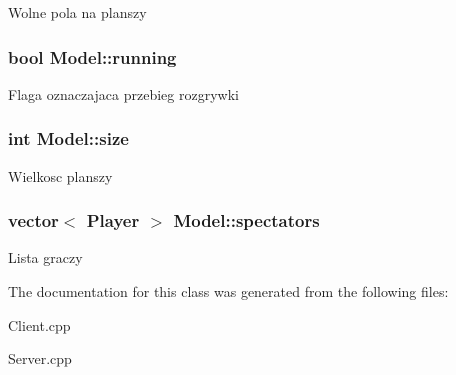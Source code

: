 Wolne pola na planszy \hypertarget{classModel_a46db7d7d8e79bf0bebd19c3e0122fba0}{
\subsubsection[{running}]{\setlength{\rightskip}{0pt plus 5cm}bool Model\-::running}}\label{classModel_a46db7d7d8e79bf0bebd19c3e0122fba0}
Flaga oznaczajaca przebieg rozgrywki \hypertarget{classModel_a944736812928acb65055f5c7229970ae}{
\subsubsection[{size}]{\setlength{\rightskip}{0pt plus 5cm}int Model\-::size}}\label{classModel_a944736812928acb65055f5c7229970ae}
Wielkosc planszy \hypertarget{classModel_a268ae9f01416e04638a2424ee0e457ac}{
\subsubsection[{spectators}]{\setlength{\rightskip}{0pt plus 5cm}vector$<$ {\bf Player} $>$ Model\-::spectators}}\label{classModel_a268ae9f01416e04638a2424ee0e457ac}
Lista graczy 

The documentation for this class was generated from the following files\-:\begin{DoxyCompactItemize}
\item 
Client.\-cpp\item 
Server.\-cpp\end{DoxyCompactItemize}

